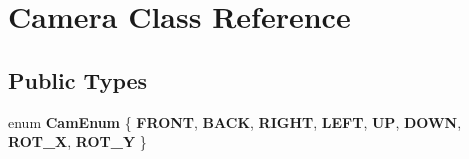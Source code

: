 \hypertarget{class_camera}{}\section{Camera Class Reference}
\label{class_camera}
\subsection*{Public Types}
\begin{DoxyCompactItemize}
\item 
\mbox{\label{class_camera_a10b22bc796e45c0dd2518cce238f4878}} 
enum {\bfseries Cam\+Enum} \{ \newline
{\bfseries F\+R\+O\+NT}, 
{\bfseries B\+A\+CK}, 
{\bfseries R\+I\+G\+HT}, 
{\bfseries L\+E\+FT}, 
\newline
{\bfseries UP}, 
{\bfseries D\+O\+WN}, 
{\bfseries R\+O\+T\+\_\+X}, 
{\bfseries R\+O\+T\+\_\+Y}
 \}
\end{DoxyCompactItemize}
